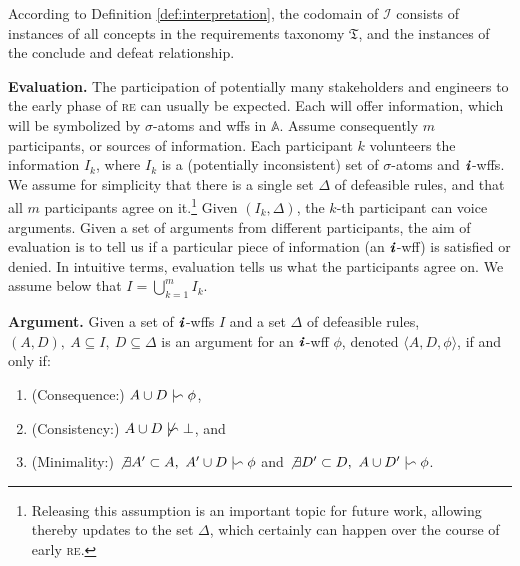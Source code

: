 \documentclass[10pt, conference, compsocconf]{IEEEtran}
\begin{document}
\begin{definition}
\begin{enumerate}
	\end{enumerate}
\end{definition}

\begin{remark}
	According to Definition \ref{def:interpretation}, the codomain of $\mathcal{I}$ consists of instances of all concepts in the requirements taxonomy $\mathfrak{T}$, and the instances of the conclude and defeat relationship.
\end{remark}


\textbf{Evaluation.} The participation of potentially many stakeholders and engineers to the early phase of \textsc{re} can usually be expected. Each will offer information, which will be symbolized by $\sigma$-atoms and wffs in $\mathbb{A}$. Assume consequently $m$ participants, or sources of information. Each participant $k$ volunteers the information $I_{k}$, where $I_{k}$ is a (potentially inconsistent) set of $\sigma$-atoms and $\textbf{\textit{i}}$-wffs. We assume for simplicity that there is a single set $\Delta$ of defeasible rules, and that all $m$ participants agree on it.\footnote{\small{Releasing this assumption is an important topic for future work, allowing thereby updates to the set $\Delta$, which certainly can happen over the course of early \textsc{re}.}} Given $(I_{k}, \Delta)$, the $k$-th participant can voice arguments. Given a set of arguments from different participants, the aim of evaluation is to tell us if a particular piece of information (an $\textbf{\textit{i}}$-wff) is satisfied or denied. In intuitive terms, evaluation tells us what the participants agree on. We assume below that $I = \bigcup_{k=1}^{m}I_{k}$.

\begin{definition}\label{def:argument}
	\textbf{Argument.} Given a set of $\textbf{\textit{i}}$-wffs $I$ and a set $\Delta$ of defeasible rules, $(A, D),\ A \subseteq I,\ D \subseteq \Delta$ is an argument for an $\textbf{\textit{i}}$-wff $\phi$, denoted $\langle A, D, \phi \rangle$, if and only if:
	\begin{enumerate}
		\item{(Consequence:) $A \cup D \mid\negthinspace\backsim \phi$,}
		\item{(Consistency:) $A \cup D \not\mid\negthinspace\backsim \bot$, and}
		\item{(Minimality:) $\not\exists A^{\prime} \subset A,\ A^{\prime} \cup D \mid\negthinspace\backsim \phi$ and $\not\exists D^{\prime} \subset D,\ A \cup D^{\prime} \mid\negthinspace\backsim \phi$.}
	\end{enumerate}
\end{definition}
\end{document}
